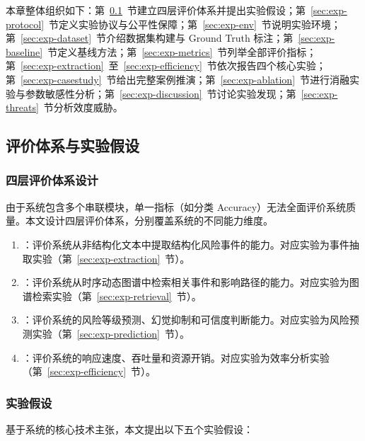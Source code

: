 本章整体组织如下：第~\ref{sec:exp-framework}~节建立四层评价体系并提出实验假设；第~\ref{sec:exp-protocol}~节定义实验协议与公平性保障；第~\ref{sec:exp-env}~节说明实验环境；第~\ref{sec:exp-dataset}~节介绍数据集构建与 Ground Truth 标注；第~\ref{sec:exp-baseline}~节定义基线方法；第~\ref{sec:exp-metrics}~节列举全部评价指标；第~\ref{sec:exp-extraction}~至~\ref{sec:exp-efficiency}~节依次报告四个核心实验；第~\ref{sec:exp-casestudy}~节给出完整案例推演；第~\ref{sec:exp-ablation}~节进行消融实验与参数敏感性分析；第~\ref{sec:exp-discussion}~节讨论实验发现；第~\ref{sec:exp-threats}~节分析效度威胁。

\subsection{评价体系与实验假设}
\label{sec:exp-framework}

\subsubsection{四层评价体系设计}

由于\projectshort 系统包含多个串联模块，单一指标（如分类 Accuracy）无法全面评价系统质量。本文设计四层评价体系，分别覆盖系统的不同能力维度。

\begin{enumerate}
    \item {}：评价系统从非结构化文本中提取结构化风险事件的能力。对应实验为事件抽取实验（第~\ref{sec:exp-extraction}~节）。
    \item {}：评价系统从时序动态图谱中检索相关事件和影响路径的能力。对应实验为图谱检索实验（第~\ref{sec:exp-retrieval}~节）。
    \item {}：评价系统的风险等级预测、幻觉抑制和可信度判断能力。对应实验为风险预测实验（第~\ref{sec:exp-prediction}~节）。
    \item {}：评价系统的响应速度、吞吐量和资源开销。对应实验为效率分析实验（第~\ref{sec:exp-efficiency}~节）。
\end{enumerate}

\subsubsection{实验假设}

基于\projectshort 系统的核心技术主张，本文提出以下五个实验假设：

